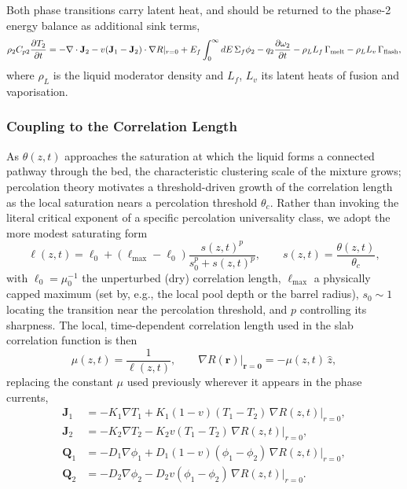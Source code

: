 \documentclass[12pt]{article}
\begin{document}
Both phase transitions carry latent heat, and should be returned to the
phase-2 energy balance as additional sink terms,
\begin{equation}
    \rho_2 C_{p2}\frac{\partial T_2}{\partial t}
        = -\nabla\cdot\mathbf{J}_2 - v(\mathbf{J}_1-\mathbf{J}_2)\cdot
        \nabla R|_{r=0}
        + E_f\int_0^\infty dE\,\Sigma_f\phi_2
        - q_2\frac{\partial \omega_2}{\partial t}
        - \rho_L L_f\,\Gamma_{\rm melt}
        - \rho_L L_v\,\Gamma_{\rm flash},
\end{equation}
where $\rho_L$ is the liquid moderator density and $L_f$, $L_v$ its latent
heats of fusion and vaporisation.

\subsubsection{Coupling to the Correlation Length}

As $\theta(z,t)$ approaches the saturation at which the liquid forms a
connected pathway through the bed, the characteristic clustering scale of
the mixture grows; percolation theory motivates a threshold-driven growth of
the correlation length as the local saturation nears a percolation
threshold $\theta_c$. Rather than invoking the literal critical exponent of
a specific percolation universality class, we adopt the more modest
saturating form
\begin{equation}
    \ell(z,t) = \ell_0
        + \left(\ell_{\max} - \ell_0\right)
        \frac{s(z,t)^p}{s_0^p + s(z,t)^p},
    \qquad
    s(z,t) = \frac{\theta(z,t)}{\theta_c},
\end{equation}
with $\ell_0 = \mu_0^{-1}$ the unperturbed (dry) correlation length,
$\ell_{\max}$ a physically capped maximum (set by, e.g., the local pool
depth or the barrel radius), $s_0 \sim 1$ locating the transition near the
percolation threshold, and $p$ controlling its sharpness. The local,
time-dependent correlation length used in the slab correlation function is
then
\begin{equation}
    \mu(z,t) = \frac{1}{\ell(z,t)}, \qquad
    \nabla R(\mathbf{r})\big|_{\mathbf{r}=\mathbf{0}} = -\mu(z,t)\,\hat{z},
\end{equation}
replacing the constant $\mu$ used previously wherever it appears in the
phase currents,
\begin{align}
    \mathbf{J}_1 &= -K_1\nabla T_1
        + K_1(1-v)(T_1-T_2)\,\nabla R(z,t)\big|_{r=0},\\
    \mathbf{J}_2 &= -K_2\nabla T_2
        - K_2 v(T_1-T_2)\,\nabla R(z,t)\big|_{r=0},\\
    \mathbf{Q}_1 &= -D_1\nabla\phi_1
        + D_1(1-v)(\phi_1-\phi_2)\,\nabla R(z,t)\big|_{r=0},\\
    \mathbf{Q}_2 &= -D_2\nabla\phi_2
        - D_2 v(\phi_1-\phi_2)\,\nabla R(z,t)\big|_{r=0}.
\end{align}
\end{document}
